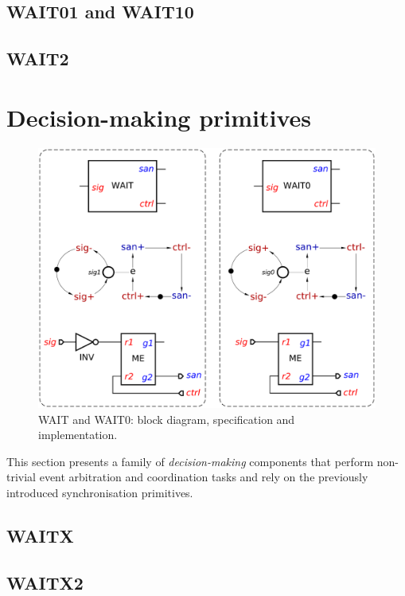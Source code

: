 \documentclass[conference]{IEEEtran}
\begin{document}
\subsection{WAIT01 and WAIT10}

\subsection{WAIT2}


\section{Decision-making primitives}

\begin{figure}
\begin{center}
    \includegraphics[scale=0.23]{fig/WAIT.pdf}
    \caption{\textsf{WAIT} and \textsf{WAIT0}: block diagram,
    specification and implementation.}
    \label{fig:wait}
\end{center}
\end{figure}

This section presents a family of \emph{decision-making} components that perform
non-trivial event arbitration and coordination tasks and rely on the previously
introduced synchronisation primitives.

\subsection{WAITX}
\subsection{WAITX2}
\end{document}
